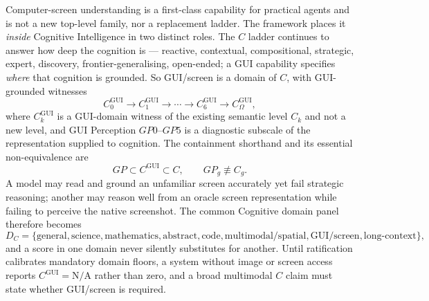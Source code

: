 Computer-screen understanding is a first-class capability for practical agents and is not a new top-level family, nor a replacement ladder. The framework places it \emph{inside} Cognitive Intelligence in two distinct roles. The $C$ ladder continues to answer how deep the cognition is --- reactive, contextual, compositional, strategic, expert, discovery, frontier-generalising, open-ended; a GUI capability specifies \emph{where} that cognition is grounded. So GUI/screen is a domain of $C$, with GUI-grounded witnesses
\[
C^{\mathrm{GUI}}_0 \to C^{\mathrm{GUI}}_1 \to \cdots \to C^{\mathrm{GUI}}_6 \to C^{\mathrm{GUI}}_{\Omega},
\]
where $C^{\mathrm{GUI}}_k$ is a GUI-domain witness of the existing semantic level $C_k$ and not a new level, and GUI Perception $GP0$--$GP5$ is a diagnostic subscale of the representation supplied to cognition. The containment shorthand and its essential non-equivalence are
\[
GP \subset C^{\mathrm{GUI}} \subset C, \qquad GP_g \not\equiv C_g .
\]
A model may read and ground an unfamiliar screen accurately yet fail strategic reasoning; another may reason well from an oracle screen representation while failing to perceive the native screenshot. The common Cognitive domain panel therefore becomes
\[
D_C = \{\text{general}, \text{science}, \text{mathematics}, \text{abstract}, \text{code}, \text{multimodal/spatial}, \text{GUI/screen}, \text{long-context}\},
\]
and a score in one domain never silently substitutes for another. Until ratification calibrates mandatory domain floors, a system without image or screen access reports $C^{\mathrm{GUI}} = \text{N/A}$ rather than zero, and a broad multimodal $C$ claim must state whether GUI/screen is required.

